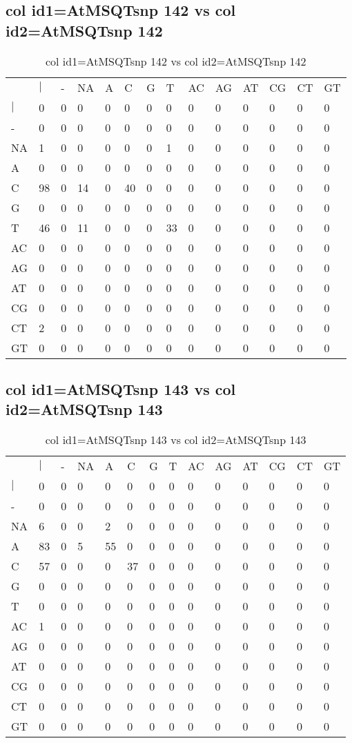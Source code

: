 \subsection{col id1=AtMSQTsnp 142 vs col id2=AtMSQTsnp 142}
\begin{center}
\begin{longtable}{|l|l|l|l|l|l|l|l|l|l|l|l|l|l|}
\caption{col id1=AtMSQTsnp 142 vs col id2=AtMSQTsnp 142} \label{table_dm530}\\
\hline
\\
\hline
&$|$&-&NA&A&C&G&T&AC&AG&AT&CG&CT&GT\\
$|$&0&0&0&0&0&0&0&0&0&0&0&0&0\\
-&0&0&0&0&0&0&0&0&0&0&0&0&0\\
NA&1&0&0&0&0&0&1&0&0&0&0&0&0\\
A&0&0&0&0&0&0&0&0&0&0&0&0&0\\
C&98&0&14&0&40&0&0&0&0&0&0&0&0\\
G&0&0&0&0&0&0&0&0&0&0&0&0&0\\
T&46&0&11&0&0&0&33&0&0&0&0&0&0\\
AC&0&0&0&0&0&0&0&0&0&0&0&0&0\\
AG&0&0&0&0&0&0&0&0&0&0&0&0&0\\
AT&0&0&0&0&0&0&0&0&0&0&0&0&0\\
CG&0&0&0&0&0&0&0&0&0&0&0&0&0\\
CT&2&0&0&0&0&0&0&0&0&0&0&0&0\\
GT&0&0&0&0&0&0&0&0&0&0&0&0&0\\
\hline
\end{longtable}
\end{center}

\subsection{col id1=AtMSQTsnp 143 vs col id2=AtMSQTsnp 143}
\begin{center}
\begin{longtable}{|l|l|l|l|l|l|l|l|l|l|l|l|l|l|}
\caption{col id1=AtMSQTsnp 143 vs col id2=AtMSQTsnp 143} \label{table_dm532}\\
\hline
\\
\hline
&$|$&-&NA&A&C&G&T&AC&AG&AT&CG&CT&GT\\
$|$&0&0&0&0&0&0&0&0&0&0&0&0&0\\
-&0&0&0&0&0&0&0&0&0&0&0&0&0\\
NA&6&0&0&2&0&0&0&0&0&0&0&0&0\\
A&83&0&5&55&0&0&0&0&0&0&0&0&0\\
C&57&0&0&0&37&0&0&0&0&0&0&0&0\\
G&0&0&0&0&0&0&0&0&0&0&0&0&0\\
T&0&0&0&0&0&0&0&0&0&0&0&0&0\\
AC&1&0&0&0&0&0&0&0&0&0&0&0&0\\
AG&0&0&0&0&0&0&0&0&0&0&0&0&0\\
AT&0&0&0&0&0&0&0&0&0&0&0&0&0\\
CG&0&0&0&0&0&0&0&0&0&0&0&0&0\\
CT&0&0&0&0&0&0&0&0&0&0&0&0&0\\
GT&0&0&0&0&0&0&0&0&0&0&0&0&0\\
\hline
\end{longtable}
\end{center}

